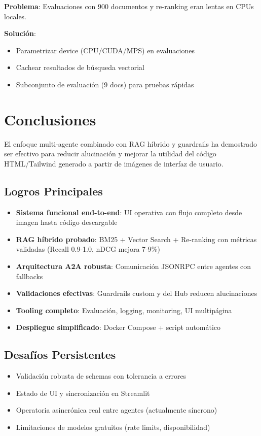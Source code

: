 \documentclass[12pt,a4paper]{article}
\begin{document}
\textbf{Problema}: Evaluaciones con 900 documentos y re-ranking eran lentas en CPUs locales.

\textbf{Solución}:
\begin{itemize}
    \item Parametrizar device (CPU/CUDA/MPS) en evaluaciones
    \item Cachear resultados de búsqueda vectorial
    \item Subconjunto de evaluación (9 docs) para pruebas rápidas
\end{itemize}

\section{Conclusiones}

El enfoque multi-agente combinado con RAG híbrido y guardrails ha demostrado ser efectivo para reducir alucinación y mejorar la utilidad del código HTML/Tailwind generado a partir de imágenes de interfaz de usuario.

\subsection{Logros Principales}

\begin{itemize}
    \item \textbf{Sistema funcional end-to-end}: UI operativa con flujo completo desde imagen hasta código descargable
    \item \textbf{RAG híbrido probado}: BM25 + Vector Search + Re-ranking con métricas validadas (Recall 0.9-1.0, nDCG mejora 7-9\%)
    \item \textbf{Arquitectura A2A robusta}: Comunicación JSONRPC entre agentes con fallbacks
    \item \textbf{Validaciones efectivas}: Guardrails custom y del Hub reducen alucinaciones
    \item \textbf{Tooling completo}: Evaluación, logging, monitoring, UI multipágina
    \item \textbf{Despliegue simplificado}: Docker Compose + script automático
\end{itemize}

\subsection{Desafíos Persistentes}

\begin{itemize}
    \item Validación robusta de schemas con tolerancia a errores
    \item Estado de UI y sincronización en Streamlit
    \item Operatoria asincrónica real entre agentes (actualmente síncrono)
    \item Limitaciones de modelos gratuitos (rate limits, disponibilidad)
\end{itemize}
\end{document}
